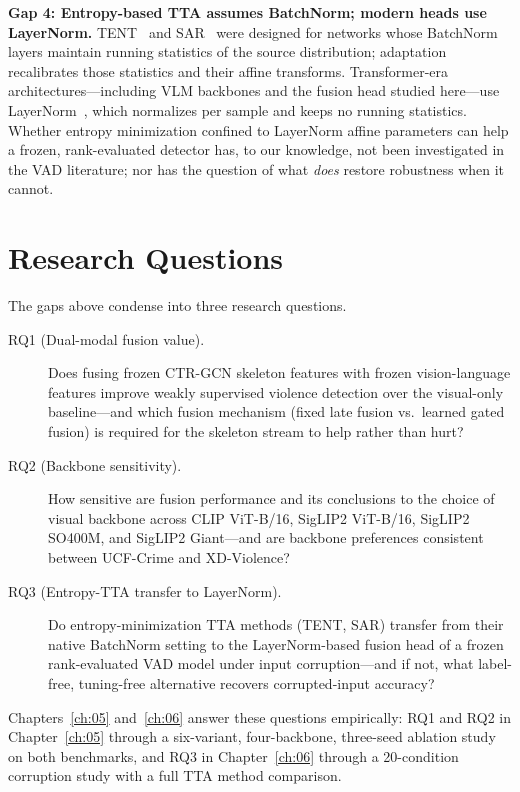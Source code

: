 \textbf{Gap 4: Entropy-based TTA assumes BatchNorm; modern heads use LayerNorm.}
TENT~\cite{wang2021tent} and SAR~\cite{niu2023sar} were designed for networks whose BatchNorm layers
maintain running statistics of the source distribution; adaptation recalibrates those statistics and
their affine transforms. Transformer-era architectures---including VLM backbones and the fusion head
studied here---use LayerNorm~\cite{ba2016layernorm}, which normalizes per sample and keeps no
running statistics. Whether entropy minimization confined to LayerNorm affine parameters can help a
frozen, rank-evaluated detector has, to our knowledge, not been investigated in the VAD literature;
nor has the question of what \emph{does} restore robustness when it cannot.

\section{Research Questions}
\label{sec:intro-rqs}

The gaps above condense into three research questions.

\begin{description}
    \item[RQ1 (Dual-modal fusion value).] Does fusing frozen CTR-GCN skeleton features with frozen
vision-language features improve weakly supervised violence detection over the visual-only
baseline---and which fusion mechanism (fixed late fusion vs.\ learned gated fusion) is required for
the skeleton stream to help rather than hurt?
    \item[RQ2 (Backbone sensitivity).] How sensitive are fusion performance and its conclusions to
the choice of visual backbone across CLIP ViT-B/16, SigLIP2 ViT-B/16, SigLIP2 SO400M, and SigLIP2
Giant---and are backbone preferences consistent between UCF-Crime and XD-Violence?
    \item[RQ3 (Entropy-TTA transfer to LayerNorm).] Do entropy-minimization TTA methods (TENT, SAR)
transfer from their native BatchNorm setting to the LayerNorm-based fusion head of a frozen
rank-evaluated VAD model under input corruption---and if not, what label-free, tuning-free
alternative recovers corrupted-input accuracy?
\end{description}

Chapters~\ref{ch:05} and~\ref{ch:06} answer these questions empirically: RQ1 and RQ2 in
Chapter~\ref{ch:05} through a six-variant, four-backbone, three-seed ablation study on both
benchmarks, and RQ3 in Chapter~\ref{ch:06} through a 20-condition corruption study with a full TTA
method comparison.

